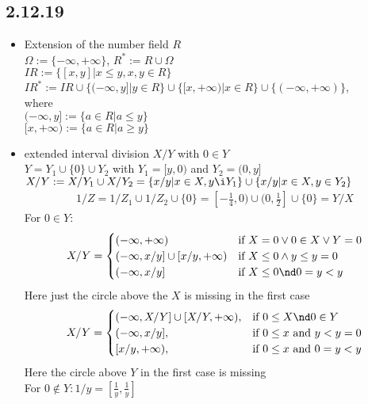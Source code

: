 \subsection*{2.12.19} 
\begin{itemize}
\item Extension of the number field $R$ \\
$\Omega:=\{-\infty, +\infty\}$, $R^*:=R \cup \Omega$ \\
$IR:=\{[x,y]|x\le y, x,y\in R\}$ \\
$IR^*:=IR\cup \{(-\infty,y]|y\in R\}\cup \{[x,+\infty)|x\in R\} \cup \{(-\infty, +\infty)\}$, \\
where \\
$(-\infty,y]:=\{a\in R|a\le y\}$ \\
$[x,+\infty):=\{a\in R|a\ge y\}$ \\
\item extended interval division $X/Y$ with $0\in Y$ \\
$Y=Y_1\cup \{0\}\cup Y_2$ with $Y_1=[y,0)$ and $Y_2=(0,y]$ \\
$X/Y:=X/Y_1 \cup X/Y_2 =\{x/y|x\in X, y\i Y_1\} \cup \{x/y| x\in X, y\in Y_2\}$ \\
\begin{align*}
1/Z=1/Z_1 \cup 1/Z_2\cup \{0\}=[-\frac{1}{4},0)\cup (0,\frac{1}{2}]\cup \{0\}=Y/X
\end{align*}
For $0\in Y: $ \\
\[
	X/Y=
	\begin{cases}
		(-\infty,+\infty) & \text{if } X=0 \vee 0\in X \vee Y=0\\
		(-\infty, x/y]\cup [x/y,+\infty) & \text{if } X\le 0 \wedge y\le y=0 \\
		(-\infty, x/y] & \text{if } X\le 0 \nd 0=y< y 
	\end{cases}
\]
Here just the circle above the $X$ is missing in the first case \\
\[
	X/Y=
	\begin{cases}
		(-\infty,X/Y]\cup[X/Y,+\infty), & \text{if } 0\le X \nd 0\in Y \\
		(-\infty, x/y], & \text{if } 0\le x \text{ and } y<y=0 \\
		[x/y,+\infty), & \text{if } 0\le x \text{ and } 0=y<y 
	\end{cases}
\]
Here the circle above $Y$ in the first case is missing \\
For $0\not \in Y: 1/y=[\frac{1}{y},\frac{1}{y}]$ \\

\end{itemize}
